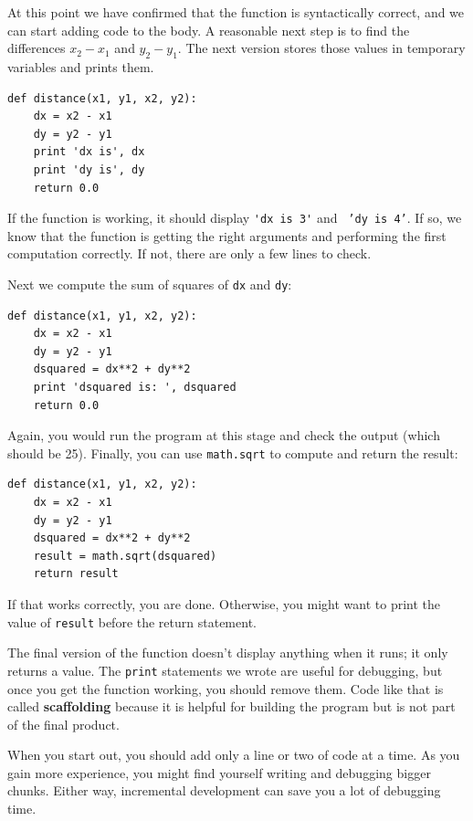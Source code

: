 
At this point we have confirmed that the function is syntactically
correct, and we can start adding code to the body.
A reasonable next step is to find the differences
$x_2 - x_1$ and $y_2 - y_1$.  The next version stores those values in
temporary variables and prints them.

\beforeverb
\begin{verbatim}
def distance(x1, y1, x2, y2):
    dx = x2 - x1
    dy = y2 - y1
    print 'dx is', dx
    print 'dy is', dy
    return 0.0
\end{verbatim}
\afterverb
%
If the function is working, it should display \verb"'dx is 3'" and {\tt
'dy is 4'}.  If so, we know that the function is getting the right
arguments and performing the first computation correctly.  If not,
there are only a few lines to check.

Next we compute the sum of squares of {\tt dx} and {\tt dy}:

\beforeverb
\begin{verbatim}
def distance(x1, y1, x2, y2):
    dx = x2 - x1
    dy = y2 - y1
    dsquared = dx**2 + dy**2
    print 'dsquared is: ', dsquared
    return 0.0
\end{verbatim}
\afterverb
%
Again, you would run the program at this stage and check the output
(which should be 25).
Finally, you can use {\tt math.sqrt} to compute and return the result:


\beforeverb
\begin{verbatim}
def distance(x1, y1, x2, y2):
    dx = x2 - x1
    dy = y2 - y1
    dsquared = dx**2 + dy**2
    result = math.sqrt(dsquared)
    return result
\end{verbatim}
\afterverb
%
If that works correctly, you are done.  Otherwise, you might
want to print the value of {\tt result} before the return
statement.

The final version of the function doesn't display anything when it
runs; it only returns a value.  The {\tt print} statements we wrote
are useful for debugging, but once you get the function working, you
should remove them.  Code like that is called {\bf scaffolding}
because it is helpful for building the program but is not part of the
final product.


When you start out, you should add only a line or two of code at a
time.  As you gain more experience, you might find yourself writing
and debugging bigger chunks.  Either way, incremental development
can save you a lot of debugging time.

